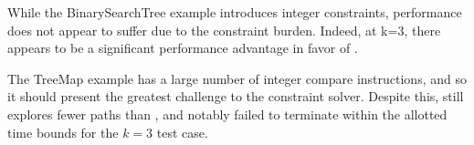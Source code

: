 While the BinarySearchTree example introduces integer constraints, \symtxt{} performance does not appear to suffer due to the constraint burden. Indeed, at k=3, there appears to be a significant performance advantage in favor of \symtxt{}.

The TreeMap example has a large number of integer compare instructions, and so it should present the greatest challenge to the constraint solver. Despite this, \symtxt{} still explores fewer paths than \gsetxt{}, and \gsetxt{} notably failed to terminate within the allotted time bounds for the $k=3$ test case.



